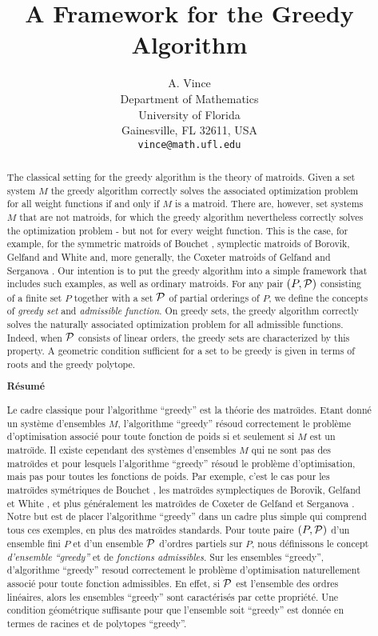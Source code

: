 \documentclass[12pt]{article}
\title{A Framework for the Greedy Algorithm}
\author{A. Vince\\Department of
Mathematics \\
University of Florida \\
Gainesville, FL 32611, USA \\
{\tt vince@math.ufl.edu}}
\date{}
\renewcommand{\P}{{\cal P}}
\begin{document}
\maketitle

\begin{abstract} The classical setting for the greedy algorithm
is the theory of matroids.  Given a set system $M$ the greedy
algorithm correctly solves the associated optimization problem for all
weight functions if and only if $M$ is a matroid.  There are, however,
set systems $M$ that are not matroids, for which the greedy algorithm
nevertheless correctly solves the optimization problem - but not for
every weight function.  This is the case, for example, for the
symmetric matroids of Bouchet \cite{bou}, symplectic matroids of
Borovik, Gelfand and White \cite{BGW} and, more generally, the Coxeter
matroids of Gelfand and Serganova \cite{GS1,GS2}.  Our intention is to
put the greedy algorithm into a simple framework that includes such
examples, as well as ordinary matroids.  For any pair $(P, \P)$
consisting of a finite set $P$ together with a set $\P$ of partial
orderings of $P$, we define the concepts of {\it greedy set} and {\it
admissible function}.  On greedy sets, the greedy algorithm correctly
solves the naturally associated optimization problem for all
admissible functions.  Indeed, when $\P$ consists of linear orders,
the greedy sets are characterized by this property.  A geometric
condition sufficient for a set to be greedy is given in terms of roots
and the greedy polytope.

\smallskip\centerline{\bf R\'esum\'e}
Le cadre classique pour l'algorithme ``greedy'' est la th\'eorie des
matro\"{\i}des. Etant donn\'e un syst\`eme d'ensembles $M$,  l'algorithme
``greedy'' r\'esoud correctement le probl\`eme d'optimisation associ\'e pour
toute fonction de poids si et seulement si $M$ est un matro\"{\i}de.
Il existe cependant des syst\`emes d'ensembles $M$ qui ne sont pas des
matro\"{\i}des et pour lesquels l'algorithme ``greedy'' r\'esoud le probl\`eme
d'optimisation, mais pas pour toutes les fonctions de poids. Par exemple, c'est
le cas pour  les  matro\"{\i}des sym\'etriques de Bouchet \cite{bou}, les
matro\"{\i}des symplectiques  de Borovik, Gelfand et White \cite{BGW}, et plus
g\'en\'eralement les matro\"{\i}des de Coxeter  de Gelfand et Serganova
\cite{GS1,GS2}. Notre but est de placer l'algorithme ``greedy'' dans un cadre
plus simple qui comprend tous ces exemples, en plus des matro\"{\i}des
standards. Pour toute paire $(P, \P)$ d'un ensemble fini $P$ et d'un ensemble
$\P$ d'ordres  partiels sur $P$, nous d\'efinissons le concept {\it d'ensemble 
``greedy''} et de {\it fonctions admissibles}. Sur les ensembles ``greedy'',
d'algorithme ``greedy'' resoud correctement le probl\`eme d'optimisation
naturellement associ\'e pour toute fonction admissibles. En effet, si $\P$ est
l'ensemble des ordres lin\'eaires, alors les ensembles ``greedy'' sont
caract\'eris\'es par cette propri\'et\'e. Une condition g\'eom\'etrique
suffisante pour que l'ensemble soit ``greedy'' est donn\'ee en termes de racines
et de polytopes ``greedy''.
\end{abstract}
\end{document}
